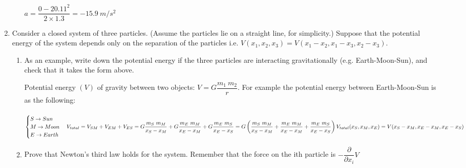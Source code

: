 \documentclass[fleqn]{article}
\begin{document}
\begin{enumerate}
\begin{enumerate}
      \textcolor{hwColor}{
        $
          a=\dfrac{0-20.11^2}{2 \times 1.3}=-15.9 ~ m/s^2
        $
      }

    \end{enumerate}

    \item Consider a closed system of three particles. (Assume the particles
    lie on a straight line, for simplicity.) Suppose that the potential energy of the system depends only on the separation of the particles i.e.
    $V(x_1, x_2, x_3)=V(x_1-x_2, x_1-x_3, x_2-x_3)$.
    \begin{enumerate}
      \item  As an example, write down the potential energy if the three particles are interacting gravitationally (e.g. Earth-Moon-Sun), and
      check that it takes the form above.

      \textcolor{hwColor}{
        Potential energy $(V)$ of gravity between two objects: $V=G\dfrac{m_1 ~ m_2}{r}$. For example 
        the potential energy between Earth-Moon-Sun is as the following: \\
        \\
        $
          \begin{cases}
            S \rightarrow Sun \\
            M \rightarrow Moon \\
            E \rightarrow Earth \\
          \end{cases} \\
          \\
          V_{total}=V_{SM}+V_{EM}+V_{ES} \\
          \\
          =G\dfrac{m_S ~ m_M}{x_S-x_M}+G\dfrac{m_E ~ m_M}{x_E-x_M}+G\dfrac{m_E ~ m_S}{x_E-x_S}=G\left(\dfrac{m_S ~ m_M}{x_S-x_M}+\dfrac{m_E ~ m_M}{x_E-x_M}+\dfrac{m_E ~ m_S}{x_E-x_S}\right) \\
          \\
          V_{total}(x_S, x_M, x_E)=V(x_S-x_M, x_E-x_M, x_E-x_S)
        $
      }

      \item Prove that Newton’s third law holds for the system. Remember
      that the force on the ith particle is $-\dfrac{\partial }{\partial x_i}V$


\end{enumerate}
\end{enumerate}
\end{document}
